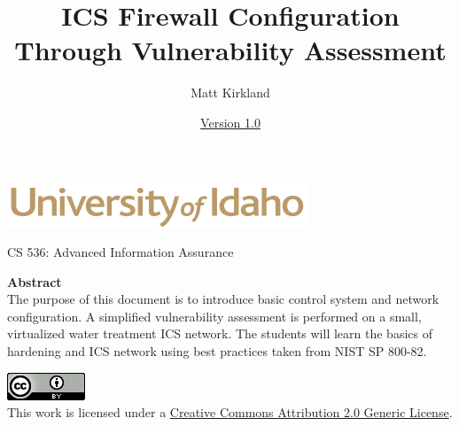 \documentclass[12pt]{extarticle}
\begin{document}
\title{ICS Firewall Configuration Through Vulnerability Assessment}
\author{Matt Kirkland}
\date{\hyperref[changelog]{Version 1.0}} %
\renewcommand{\abstractname}{Summary}
\begin{titlepage}
\maketitle
{}
\begin{center}
\includegraphics[scale=.5]{figures/UofI}

\large{CS 536: Advanced Information Assurance}

\vskip 40pt

\textbf{Abstract}\\
The purpose of this document is to introduce basic control system and network configuration. A simplified vulnerability assessment is performed on a small, virtualized water treatment ICS network. The students will learn the basics of hardening and ICS network using best practices taken from NIST SP 800-82.
\end{center}


\vfill
\begin{center}
\includegraphics[scale=.5]{figures/cc}\\
This work is licensed under a \href{https://creativecommons.org/licenses/by/2.0/}{Creative Commons Attribution 2.0 Generic License}.
\vskip 10pt
\end{center}

\end{titlepage}


\pagebreak
\tableofcontents


\pagebreak
{}
\setcounter{section}{1}



\end{document}
